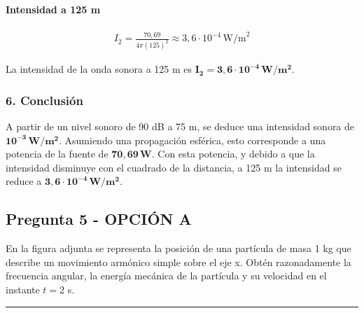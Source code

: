 \paragraph*{Intensidad a 125 m}
\begin{gather}
    I_2 = \frac{70,69}{4\pi (125)^2} \approx 3,6 \cdot 10^{-4} \, \text{W/m}^2
\end{gather}
\begin{cajaresultado}
    La intensidad de la onda sonora a 125 m es $\boldsymbol{I_2 = 3,6 \cdot 10^{-4} \, W/m^2}$.
\end{cajaresultado}

\subsubsection*{6. Conclusión}
\begin{cajaconclusion}
    A partir de un nivel sonoro de 90 dB a 75 m, se deduce una intensidad sonora de $\mathbf{10^{-3} \, W/m^2}$. Asumiendo una propagación esférica, esto corresponde a una potencia de la fuente de $\mathbf{70,69 \, W}$. Con esta potencia, y debido a que la intensidad disminuye con el cuadrado de la distancia, a 125 m la intensidad se reduce a $\mathbf{3,6 \cdot 10^{-4} \, W/m^2}$.
\end{cajaconclusion}

\newpage

\subsection{Pregunta 5 - OPCIÓN A}
\label{subsec:5A_2025_jul_ord}

\begin{cajaenunciado}
En la figura adjunta se representa la posición de una partícula de masa 1 kg que describe un movimiento armónico simple sobre el eje x. Obtén razonadamente la frecuencia angular, la energía mecánica de la partícula y su velocidad en el instante $t=2$ s.
\end{cajaenunciado}
\hrule

